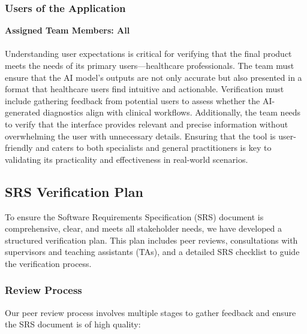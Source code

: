 \documentclass[12pt, titlepage]{article}
\begin{document}
\subsubsection{Users of the Application}
\textbf{Assigned Team Members: All} \\\\
Understanding user expectations is critical for verifying that the final product meets the needs of its primary users—healthcare professionals. The team must ensure that the AI model's outputs are not only accurate but also presented in a format that healthcare users find intuitive and actionable. Verification must include gathering feedback from potential users to assess whether the AI-generated diagnostics align with clinical workflows. Additionally, the team needs to verify that the interface provides relevant and precise information without overwhelming the user with unnecessary details. Ensuring that the tool is user-friendly and caters to both specialists and general practitioners is key to validating its practicality and effectiveness in real-world scenarios.


\subsection{SRS Verification Plan}

To ensure the Software Requirements Specification (SRS) document is comprehensive, clear, and meets all stakeholder needs, we have developed a structured verification plan. This plan includes peer reviews, consultations with supervisors and teaching assistants (TAs), and a detailed SRS checklist to guide the verification process.

\subsubsection{Review Process}

Our peer review process involves multiple stages to gather feedback and ensure the SRS document is of high quality:
\end{document}
